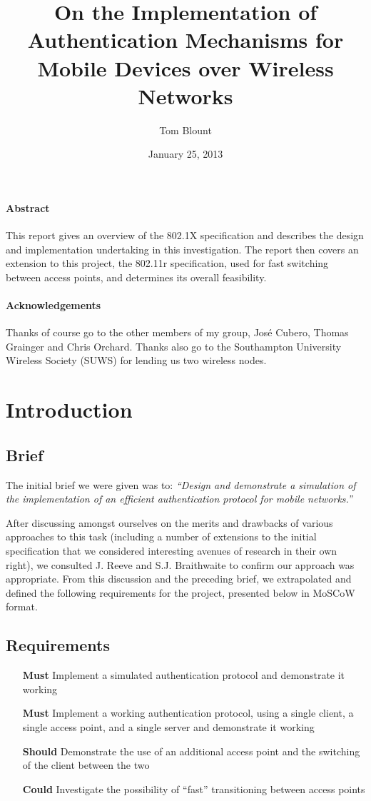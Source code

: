 \documentclass[12pt,a4paper,titlepage]{article}
\author{Tom Blount}
\date{January 25, 2013}
\title{On the Implementation of Authentication Mechanisms for Mobile Devices over Wireless Networks}
\begin{document}
\maketitle

\tableofcontents
\newpage
\paragraph{Abstract}
This report gives an overview of the 802.1X specification and describes the design and implementation undertaking in this investigation. The report then covers an extension to this project, the 802.11r specification, used for fast switching between access points, and determines its overall feasibility.

\paragraph{Acknowledgements}
Thanks of course go to the other members of my group, José Cubero, Thomas Grainger and Chris Orchard.
Thanks also go to the Southampton University Wireless Society (SUWS) for lending us two wireless nodes.

\newpage
\section{Introduction}

\subsection{Brief}
The initial brief we were given was to: 
\textit{{\quote ``Design and demonstrate a simulation of the implementation of an efficient authentication protocol for mobile networks.''}}

After discussing amongst ourselves on the merits and drawbacks of various approaches to this task (including a number of extensions to the initial specification that we considered interesting avenues of research in their own right), we consulted J. Reeve and S.J. Braithwaite to confirm our approach was appropriate. From this discussion and the preceding brief, we extrapolated and defined the following requirements for the project, presented below in MoSCoW format.

\subsection{Requirements}
\begin{itemize}
\item[\textbf{Must}] Implement a simulated authentication protocol and demonstrate it working
\item[\textbf{Must}] Implement a working authentication protocol, using a single client, a single access point, and a single server and demonstrate it working
\item[\textbf{Should}] Demonstrate the use of an additional access point and the switching of the client between the two
\item[\textbf{Could}] Investigate the possibility of ``fast'' transitioning between access points
\end{itemize}
\end{document}
